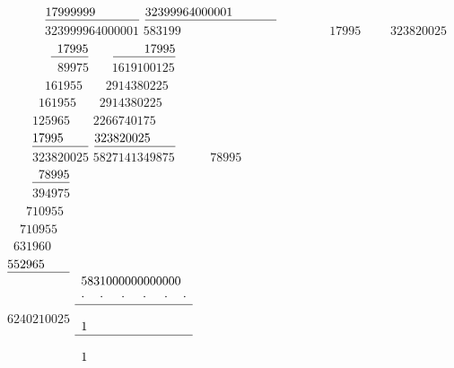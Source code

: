 $\phantom{000000}\underline{17999999\phantom{0000000}\vphantom{j}}$%
\hspace{35mm}%
$\underline{32399964000001\phantom{0000000}\vphantom{j}}$%
\\
$\phantom{000000}323999964000001$%
\hspace{35mm}%
$583199\phantom{000000000000000}$%
\pend%
\newpage%
\pstart%
\noindent%
\centering%
$\phantom{0000}\phantom{0000}17995$%
\hspace{35mm}%
$\phantom{0000}323820025$%
\\
$\phantom{0000}\phantom{000}\underline{\phantom{0}17995\vphantom{j}}$%
\hspace{35mm}%
$\phantom{000}\underline{\phantom{0000}\phantom{0}17995\vphantom{j}}$%
\\
$\phantom{0000}\phantom{0000}89975$%
\hspace{35mm}%
$\phantom{000}1619100125$%
\\
$\phantom{0000}\phantom{00}161955\phantom{0}$%
\hspace{35mm}%
$\phantom{00}2914380225\phantom{0}$%
\\
$\phantom{0000}\phantom{0}161955\phantom{00}$%
\hspace{35mm}%
$\phantom{0}2914380225\phantom{00}$%
\\
$\phantom{0000}125965\phantom{000}$%
\hspace{35mm}%
$2266740175\phantom{000}$%
\\
$\phantom{0000}\underline{17995\phantom{0000}\vphantom{j}}$%
\hspace{35mm}%
$\underline{323820025\phantom{0000}\vphantom{j}}$%
\\
$\phantom{0000}323820025$%
\hspace{35mm}%
$5827141349875$%
\pend%
\vspace{2.5em}%
\pstart%
\noindent%
\centering%
$\phantom{00000}78995$%
\\
$\phantom{0000}\underline{\phantom{0}78995\vphantom{j}}$%
\\
$\phantom{0000}394975$%
\\
$\phantom{000}710955\phantom{0}$%
\\
$\phantom{00}710955\phantom{00}$%
\\
$\phantom{0}631960\phantom{000}$%
\\
$\underline{552965\phantom{0000}\vphantom{j}}$%
\\
$6240210025$%
\pend%
\vspace{3.5em}%
\pstart%
\noindent%
\centering%
$\begin{array}{l}
5831000000000000%
\\
\cdot\phantom{83}\cdot\phantom{00}\cdot\phantom{00}\cdot\phantom{00}\cdot\phantom{00}\cdot%
\\
\hline%
\\
1%
\\
\hline%
\\
1%
\end{array}$%
%
\pend%
%
\frenchspacing%
\normalsize%

